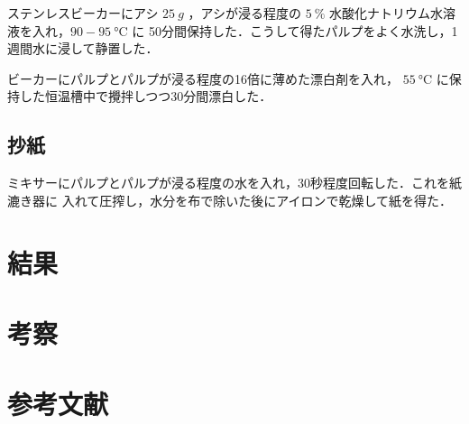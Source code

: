 \documentclass[uplatex, dvipdfmx, 10pt]{jarticle}
\begin{document}
                ステンレスビーカーにアシ $\SI{25}{g}$ ，アシが浸る程度の
                $\SI{5}{\%}$ 水酸化ナトリウム水溶液を入れ，$90-\SI{95}{\celsius}$ に
                50分間保持した．こうして得たパルプをよく水洗し，1週間水に浸して静置した．

                ビーカーにパルプとパルプが浸る程度の16倍に薄めた漂白剤を入れ，
                $\SI{55}{\celsius}$ に保持した恒温槽中で攪拌しつつ30分間漂白した．

            \subsection*{抄紙}

                ミキサーにパルプとパルプが浸る程度の水を入れ，30秒程度回転した．これを紙漉き器に
                入れて圧搾し，水分を布で除いた後にアイロンで乾燥して紙を得た．


        \section*{結果}

        \section*{考察}

        \section*{参考文献}

        
    
\end{document}
